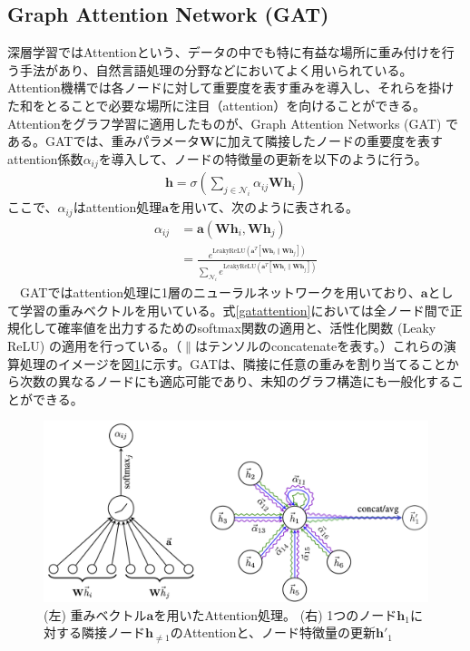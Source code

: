 \subsection{Graph Attention Network (GAT)}
\label{GATexplain}
深層学習ではAttentionという、データの中でも特に有益な場所に重み付けを行う手法があり、自然言語処理の分野などにおいてよく用いられている。Attention機構では各ノードに対して重要度を表す重みを導入し、それらを掛けた和をとることで必要な場所に注目（attention）を向けることができる。Attentionをグラフ学習に適用したものが、Graph Attention Networks (GAT) \cite{gat} である。GATでは、重みパラメータ$\bm{W}$に加えて隣接したノードの重要度を表すattention係数$\alpha_{ij}$を導入して、ノードの特徴量の更新を以下のように行う。
\begin{align}
\bm{h} = \sigma (\sum_{j \in \mathcal{N}_i} \alpha_{ij} \bm{W} \bm{h}_i )
\end{align}
ここで、$\alpha_{ij}$はattention処理$\bm{a}$を用いて、次のように表される。
\begin{align}
\alpha_{ij} &= \bm{a}(\bm{W}\bm{h}_i, \bm{W}\bm{h}_j)\\
 &= \frac{e^{\mathrm{LeakyReLU}(\bm{a}^T [ \bm{W}\bm{h}_i \parallel \bm{W}\bm{h}_j ])}}{\sum_{\mathcal{N}_i} e^{\mathrm{LeakyReLU}(\bm{a}^T [ \bm{W}\bm{h}_i \parallel  \bm{W}\bm{h}_j ])}}
\label{gatattention}
\end{align}
　GATではattention処理に1層のニューラルネットワークを用いており、$\bm{a}$として学習の重みベクトルを用いている。式\ref{gatattention}においては全ノード間で正規化して確率値を出力するためのsoftmax関数の適用と、活性化関数 (Leaky ReLU) の適用を行っている。（$\parallel$はテンソルのconcatenateを表す。）これらの演算処理のイメージを図\ref{gatt}に示す。GATは、隣接に任意の重みを割り当てることから次数の異なるノードにも適応可能であり、未知のグラフ構造にも一般化することができる。
\begin{figure}[H]
	\begin{center}
 \includegraphics[keepaspectratio, scale=0.25]
 	{Figure/Deeplearning/gat.png}
 		\caption{ (左) 重みベクトル$\bm{a}$を用いたAttention処理。 (右) 1つのノード$\bm{h}_1$に対する隣接ノード$\bm{h}_{\neq 1}$のAttentionと、ノード特徴量の更新$\bm{h'}_1$}
		\label{gatt}
	\end{center}
\end{figure}